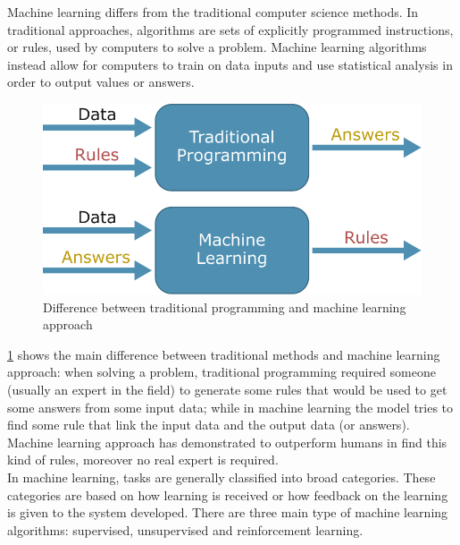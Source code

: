 Machine learning differs from the traditional computer science methods.  In traditional approaches, algorithms are sets of explicitly programmed instructions, or rules, used by computers to solve a problem. Machine learning algorithms instead allow for computers to train on data inputs and use statistical analysis in order to output values or answers. \\

\begin{figure}[H]
\centering
    \includegraphics[width=.45\linewidth]{images/Background/ML/MLvstrad.pdf}
\caption[Traditional and machine learning approaches]{Difference between traditional programming and machine learning approach}
\label{fig:tradvsml}
\end{figure}

\noindent \ref{fig:tradvsml} shows the main difference between traditional methods and machine learning approach: when solving a problem, traditional programming required someone (usually an expert in the field) to generate some rules that would be used to get some answers from some input data; while in machine learning the model tries to find some rule that link the input data and the output data (or answers). Machine learning approach has demonstrated to outperform humans in find this kind of rules, moreover no real expert is required. \\

In machine learning, tasks are generally classified into broad categories. These categories are based on how learning is received or how feedback on the learning is given to the system developed.
There are three main type of machine learning algorithms: supervised, unsupervised and reinforcement learning.

